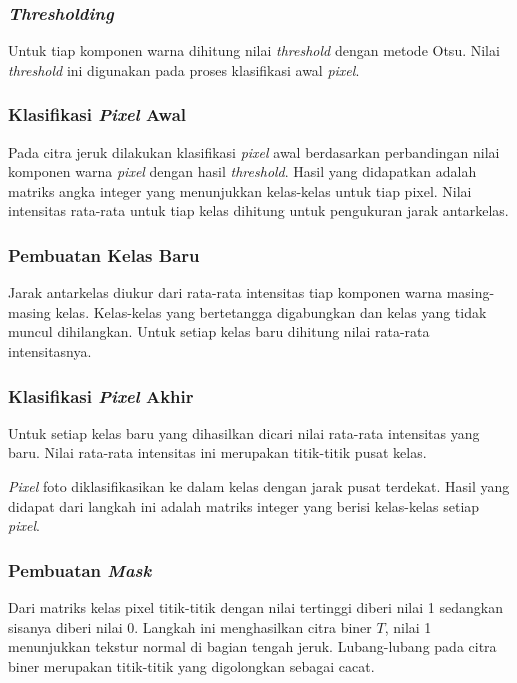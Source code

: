\documentclass[laporan.tex]{subfiles}
\begin{document}
\subsubsection{\emph{Thresholding}}

Untuk tiap komponen warna dihitung nilai \emph{threshold} dengan metode Otsu. Nilai \emph{threshold} ini digunakan pada proses klasifikasi awal \emph{pixel}.

\subsubsection{Klasifikasi \emph{Pixel} Awal}

Pada citra jeruk dilakukan klasifikasi \emph{pixel} awal berdasarkan perbandingan nilai komponen warna \emph{pixel} dengan hasil \emph{threshold}. Hasil yang didapatkan adalah matriks angka integer yang menunjukkan kelas-kelas untuk tiap pixel. Nilai intensitas rata-rata untuk tiap kelas dihitung untuk pengukuran jarak antarkelas.

\subsubsection{Pembuatan Kelas Baru}

Jarak antarkelas diukur dari rata-rata intensitas tiap komponen warna masing-masing kelas. Kelas-kelas yang bertetangga digabungkan dan kelas yang tidak muncul dihilangkan. Untuk setiap kelas baru dihitung nilai rata-rata intensitasnya.

\subsubsection{Klasifikasi \emph{Pixel} Akhir}

Untuk setiap kelas baru yang dihasilkan dicari nilai rata-rata intensitas yang baru. Nilai rata-rata intensitas ini merupakan titik-titik pusat kelas.

\emph{Pixel} foto diklasifikasikan ke dalam kelas dengan jarak pusat terdekat. Hasil yang didapat dari langkah ini adalah matriks integer yang berisi kelas-kelas setiap \emph{pixel}.

\subsubsection{Pembuatan \emph{Mask}}

Dari matriks kelas pixel titik-titik dengan nilai tertinggi diberi nilai 1 sedangkan sisanya diberi nilai 0. Langkah ini menghasilkan citra biner $T$, nilai 1 menunjukkan tekstur normal di bagian tengah jeruk. Lubang-lubang pada citra biner merupakan titik-titik yang digolongkan sebagai cacat.
\end{document}
